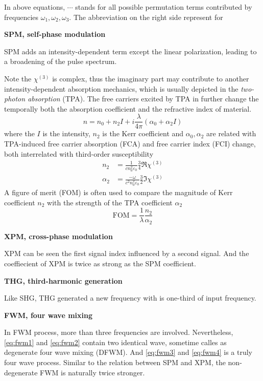 In above equations, $\cdots$ stands for all possible permutation terms contributed by frequencies $\omega_1, \omega_2, \omega_3$. The abbreviation on the right side represent for 

\bigskip
\noindent\textbf{SPM, self-phase modulation}

SPM adds an intensity-dependent term except the linear polarization, leading to a broadening of the pulse spectrum.

Note the $\chi^{(3)}$ is complex, thus the imaginary part may contribute to another intensity-dependent absorption mechanics, which is usually depicted in the \textit{two-photon absorption} (TPA). The free carriers excited by TPA in further change the temporally both the absorption coefficient and the refractive index of material.
\begin{equation}\label{eq:spm-index}
    n = n_0 + n_2 I + i \frac{\lambda}{4\pi}(\alpha_0 + \alpha_2 I)
\end{equation}
where the $I$ is the intensity, $n_2$ is the Kerr coefficient and $\alpha_0, \alpha_2$ are related with TPA-induced free carrier absorption (FCA) and free carrier index (FCI) change, both interrelated with third-order susceptibility
\begin{align}
    n_2     &= \frac{1}{cn_0^2\varepsilon_0} \frac{3}{4} \Re{\chi^{(3)}} \\
    \alpha_2&= \frac{-\omega}{c^2n_0^2\varepsilon_0} \frac{3}{2} \Im{\chi^{(3)}}
\end{align}
A figure of merit (FOM) is often used to compare the magnitude of Kerr coefficient $n_2$ with the strength of the TPA coefficient $\alpha_2$
\begin{equation}
    \mathrm{FOM} = \frac{1}{\lambda} \frac{n_2}{\alpha_2}
\end{equation}

\bigskip
\noindent\textbf{XPM, cross-phase modulation} 

XPM can be seen the first signal index influenced by a second signal. And the coeffiecient of XPM is twice as strong as the SPM coefficient.

\bigskip
\noindent\textbf{THG, third-harmonic generation} 

Like SHG, THG generated a new frequency with is one-third of input frequency. 

\bigskip
\noindent\textbf{FWM, four wave mixing} 

In FWM process, more than three frequencies are involved. Nevertheless, \autoref{eq:fwm1} and \autoref{eq:fwm2} contain two identical wave, sometime calles as degenerate four wave mixing (DFWM). And \autoref{eq:fwm3} and \autoref{eq:fwm4} is a truly four wave process. Similar to the relation between SPM and XPM, the non-degenerate FWM is naturally twice stronger.

